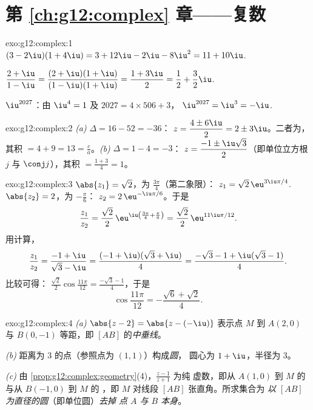 \section*{第 \ref{ch:g12:complex} 章——复数}

\begin{solution}{exo:g12:complex:1}
$(3-2\iu)(1+4\iu) = 3 + 12\iu - 2\iu - 8\iu^2 = 11 + 10\iu$.

$\dfrac{2+\iu}{1-\iu} = \dfrac{(2+\iu)(1+\iu)}{(1-\iu)(1+\iu)}
= \dfrac{1 + 3\iu}{2} = \dfrac12 + \dfrac32\iu$.

$\iu^{2027}$：由 $\iu^4 = 1$ 及 $2027 = 4 \times 506 + 3$，
$\iu^{2027} = \iu^3 = -\iu$.
\end{solution}

\begin{solution}{exo:g12:complex:2}
\emph{(a)} $\Delta = 16 - 52 = -36$：
$z = \dfrac{4 \pm 6\iu}{2} = 2 \pm 3\iu$。二者为，其积
$= 4 + 9 = 13 = \frac ca$。\emph{(b)} $\Delta = 1 - 4 = -3$：
$z = \dfrac{-1 \pm \iu\sqrt3}{2}$（即单位立方根 $j$ 与
$\conj j$），其积 $= \frac{1 + 3}{4} = 1$。
\end{solution}

\begin{solution}{exo:g12:complex:3}
$\abs{z_1} = \sqrt2$，为 $\frac{3\pi}{4}$（第二象限）：
$z_1 = \sqrt2\,\eu^{3\iu\pi/4}$.
$\abs{z_2} = 2$，为 $-\frac\pi6$：
$z_2 = 2\,\eu^{-\iu\pi/6}$。于是
\[
\frac{z_1}{z_2} = \frac{\sqrt2}{2}\,\eu^{\iu\left(\frac{3\pi}{4} + \frac{\pi}{6}\right)}
= \frac{\sqrt2}{2}\,\eu^{11\iu\pi/12}.
\]
用计算，
\[
\frac{z_1}{z_2} = \frac{-1+\iu}{\sqrt3 - \iu}
= \frac{(-1+\iu)(\sqrt3+\iu)}{4}
= \frac{-\sqrt3 - 1 + \iu(\sqrt3 - 1)}{4}.
\]
比较可得：
$\frac{\sqrt2}{2}\cos\frac{11\pi}{12} = \frac{-\sqrt3-1}{4}$，于是
\[
\cos\frac{11\pi}{12} = -\frac{\sqrt6 + \sqrt2}{4}.
\]
\end{solution}

\begin{solution}{exo:g12:complex:4}
\emph{(a)} $\abs{z - 2} = \abs{z - (-\iu)}$ 表示点 $M$ 到
$A(2, 0)$ 与 $B(0, -1)$ 等距，即 $[AB]$ 的\emph{中垂线}。

\emph{(b)} 距离为 $3$ 的点（参照点为 $(1,1)$）构成\emph{圆}，
圆心为 $1 + \iu$，半径为 $3$。

\emph{(c)} 由 \cref{prop:g12:complex:geometry}(4)，$\frac{z-1}{z+1}$ 为纯
虚数，即从 $A(1,0)$ 到 $M$ 的与从 $B(-1,0)$ 到 $M$ 的
，即 $M$ 对线段 $[AB]$ 张直角。所求集合为
\emph{以 $[AB]$ 为直径的圆}（即单位圆）\emph{去掉
点 $A$ 与 $B$ 本身}。
\end{solution}

